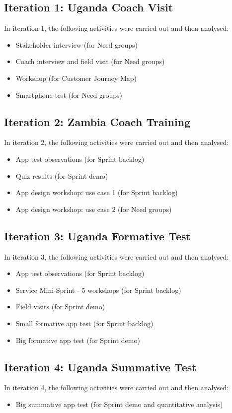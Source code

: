 \subsection{Iteration 1: Uganda Coach Visit}

In iteration 1, the following activities were carried out and then analysed:

\begin{itemize}
\item Stakeholder interview (for Need groups)
\item Coach interview and field visit (for Need groups)
\item Workshop (for Customer Journey Map)
\item Smartphone test (for Need groups)
\end{itemize}

\subsection{Iteration 2: Zambia Coach Training}

In iteration 2, the following activities were carried out and then analysed:

\begin{itemize}
\item App test observations (for Sprint backlog)
\item Quiz results (for Sprint demo)
\item App design workshop: use case 1 (for Sprint backlog)
\item App design workshop: use case 2 (for Need groups)
\end{itemize}

\subsection{Iteration 3: Uganda Formative Test}

In iteration 3, the following activities were carried out and then analysed:

\begin{itemize}
\item App test observations (for Sprint backlog)
\item Service Mini-Sprint - 5 workshops (for Sprint backlog)
\item Field visits (for Sprint demo)
\item Small formative app test (for Sprint backlog)
\item Big formative app test (for Sprint demo)
\end{itemize}

\subsection{Iteration 4: Uganda Summative Test}

In iteration 4, the following activities were carried out and then analysed:

\begin{itemize}
\item Big summative app test (for Sprint demo and quantitative analysis)
\end{itemize}
